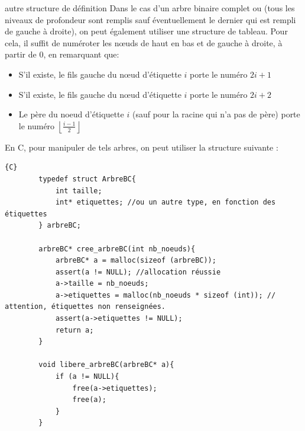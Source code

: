 \begin{exemple}{7.13}{autre structure de définition}
    Dans le cas d'un arbre binaire complet ou  (tous les niveaux de profondeur sont remplis sauf éventuellement le dernier qui est rempli de gauche à droite), on peut également utiliser une structure de tableau. Pour cela, il suffit de numéroter les nœuds de haut en bas et de gauche à droite, à partir de 0, en remarquant que: 
    \begin{itemize}
        \item S'il existe, le fils gauche du nœud d'étiquette $i$ porte le numéro $2i + 1$
        \item S'il existe, le fils gauche du nœud d'étiquette $i$ porte le numéro $2i + 2$
        \item Le père du noeud d'étiquette $i$ (sauf pour la racine qui n'a pas de père) porte le numéro $\left\lfloor \frac{i-1}{2}\right\rfloor $
    \end{itemize}
    \begin{center}
\end{center}
    
    En C, pour manipuler de tels arbres, on peut utiliser la structure suivante :
    \begin{verbatim}{C}
        typedef struct ArbreBC{
            int taille;
            int* etiquettes; //ou un autre type, en fonction des étiquettes
        } arbreBC;

        arbreBC* cree_arbreBC(int nb_noeuds){
            arbreBC* a = malloc(sizeof (arbreBC));
            assert(a != NULL); //allocation réussie
            a->taille = nb_noeuds;
            a->etiquettes = malloc(nb_noeuds * sizeof (int)); // attention, étiquettes non renseignées.
            assert(a->etiquettes != NULL);
            return a;
        }

        void libere_arbreBC(arbreBC* a){
            if (a != NULL){
                free(a->etiquettes);
                free(a);
            }
        }
    \end{verbatim}
\end{exemple}

